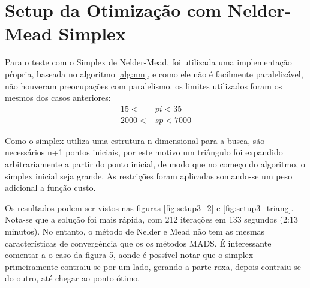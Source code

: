 \section{Setup da Otimização com Nelder-Mead Simplex}

Para o teste com o Simplex de Nelder-Mead, foi utilizada uma implementação pŕopria, baseada no algoritmo \ref{alg:nm}, e como ele não é facilmente paralelizável, não houveram preocupações com paralelismo.
os limites utilizados foram os mesmos dos casos anteriores:
\begin{align}
15 < &pi < 35 \\
2000 < &sp < 7000
\end{align}

Como o simplex utiliza uma estrutura n-dimensional para a busca, são necessários n+1 pontos iniciais, por este motivo um triângulo foi expandido arbitrariamente a partir do ponto inicial, de modo que no começo do algoritmo, o simplex inicial seja grande. As restrições foram aplicadas somando-se um peso adicional a função custo.

Os resultados podem ser vistos nas figuras \ref{fig:setup3_2} e \ref{fig:setup3_triang}. Nota-se que a solução foi mais rápida, com 212 iterações em 133 segundos (2:13 minutos). No entanto, o método de Nelder e Mead não tem as mesmas características de convergência que os os métodos MADS. É interessante comentar a o caso da figura 5, aonde é possível notar que o simplex primeiramente contraiu-se por um lado, gerando a parte roxa, depois contraiu-se do outro, até chegar ao ponto ótimo.




